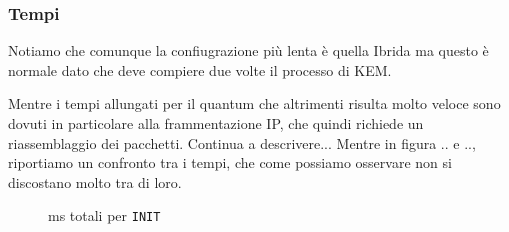 \newpage
\subsubsection*{Tempi}

Notiamo che comunque la confiugrazione più lenta è quella Ibrida
ma questo è normale dato che deve compiere due volte il processo di KEM.

Mentre i tempi allungati per il quantum che altrimenti risulta molto veloce sono 
dovuti in particolare alla frammentazione IP, che quindi richiede un riassemblaggio dei pacchetti.
Continua a descrivere...
Mentre in figura .. e .., riportiamo un confronto tra i tempi, che come possiamo osservare non si discostano molto 
tra di loro.


\begin{figure}[h!] 
    \centering 
    \caption{ms totali per \texttt{INIT}}
    \label{fig:tempi_init} 
\end{figure}

